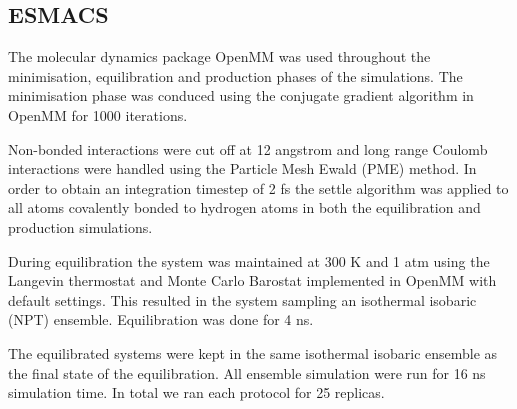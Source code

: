
\subsection{ESMACS}

The molecular dynamics package OpenMM \cite{eastman2017openmm} was used throughout the minimisation, equilibration and production phases of the simulations. The minimisation phase was conduced using the conjugate gradient algorithm in OpenMM for 1000 iterations.

Non-bonded interactions were cut off at 12 angstrom and long range Coulomb interactions were handled using the Particle Mesh Ewald (PME) method. In order to obtain an integration timestep of 2 fs the settle \cite{miyamoto1992settle} algorithm was applied to all atoms covalently bonded to hydrogen atoms in both the equilibration and production simulations.

During equilibration the system was maintained at 300 K and 1 atm using the Langevin thermostat and Monte Carlo Barostat implemented in OpenMM with default settings. This resulted in the system sampling an isothermal isobaric (NPT) ensemble. Equilibration was done for 4 ns.

The equilibrated systems were kept in the same isothermal isobaric ensemble as the final state of the equilibration. All ensemble simulation were run for 16 ns simulation time. In total we ran each protocol for 25 replicas.
